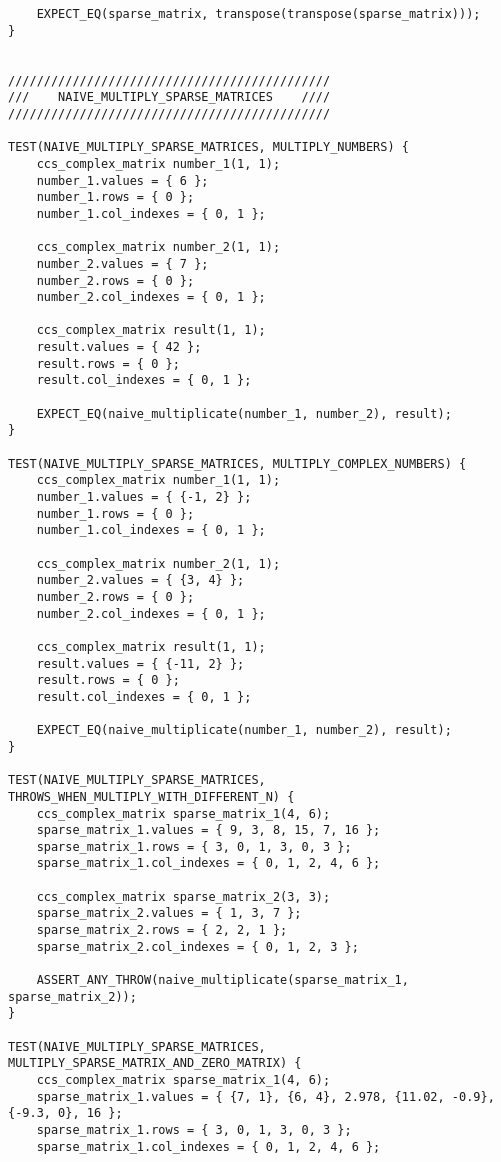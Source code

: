 \documentclass{report}
\begin{document}
\begin{itemize}
\begin{itemize}
\begin{lstlisting}
    EXPECT_EQ(sparse_matrix, transpose(transpose(sparse_matrix)));
}


/////////////////////////////////////////////
///    NAIVE_MULTIPLY_SPARSE_MATRICES    ////
/////////////////////////////////////////////

TEST(NAIVE_MULTIPLY_SPARSE_MATRICES, MULTIPLY_NUMBERS) {
    ccs_complex_matrix number_1(1, 1);
    number_1.values = { 6 };
    number_1.rows = { 0 };
    number_1.col_indexes = { 0, 1 };
    
    ccs_complex_matrix number_2(1, 1);
    number_2.values = { 7 };
    number_2.rows = { 0 };
    number_2.col_indexes = { 0, 1 };
    
    ccs_complex_matrix result(1, 1);
    result.values = { 42 };
    result.rows = { 0 };
    result.col_indexes = { 0, 1 };

    EXPECT_EQ(naive_multiplicate(number_1, number_2), result);
}

TEST(NAIVE_MULTIPLY_SPARSE_MATRICES, MULTIPLY_COMPLEX_NUMBERS) {
    ccs_complex_matrix number_1(1, 1);
    number_1.values = { {-1, 2} };
    number_1.rows = { 0 };
    number_1.col_indexes = { 0, 1 };
    
    ccs_complex_matrix number_2(1, 1);
    number_2.values = { {3, 4} };
    number_2.rows = { 0 };
    number_2.col_indexes = { 0, 1 };
    
    ccs_complex_matrix result(1, 1);
    result.values = { {-11, 2} };
    result.rows = { 0 };
    result.col_indexes = { 0, 1 };

    EXPECT_EQ(naive_multiplicate(number_1, number_2), result);
}

TEST(NAIVE_MULTIPLY_SPARSE_MATRICES, THROWS_WHEN_MULTIPLY_WITH_DIFFERENT_N) {
    ccs_complex_matrix sparse_matrix_1(4, 6);
    sparse_matrix_1.values = { 9, 3, 8, 15, 7, 16 };
    sparse_matrix_1.rows = { 3, 0, 1, 3, 0, 3 };
    sparse_matrix_1.col_indexes = { 0, 1, 2, 4, 6 };
    
    ccs_complex_matrix sparse_matrix_2(3, 3);
    sparse_matrix_2.values = { 1, 3, 7 };
    sparse_matrix_2.rows = { 2, 2, 1 };
    sparse_matrix_2.col_indexes = { 0, 1, 2, 3 };
    
    ASSERT_ANY_THROW(naive_multiplicate(sparse_matrix_1, sparse_matrix_2));
}

TEST(NAIVE_MULTIPLY_SPARSE_MATRICES, MULTIPLY_SPARSE_MATRIX_AND_ZERO_MATRIX) {
    ccs_complex_matrix sparse_matrix_1(4, 6);
    sparse_matrix_1.values = { {7, 1}, {6, 4}, 2.978, {11.02, -0.9}, {-9.3, 0}, 16 };
    sparse_matrix_1.rows = { 3, 0, 1, 3, 0, 3 };
    sparse_matrix_1.col_indexes = { 0, 1, 2, 4, 6 };
    

\end{lstlisting}
\end{itemize}
\end{itemize}
\end{document}
